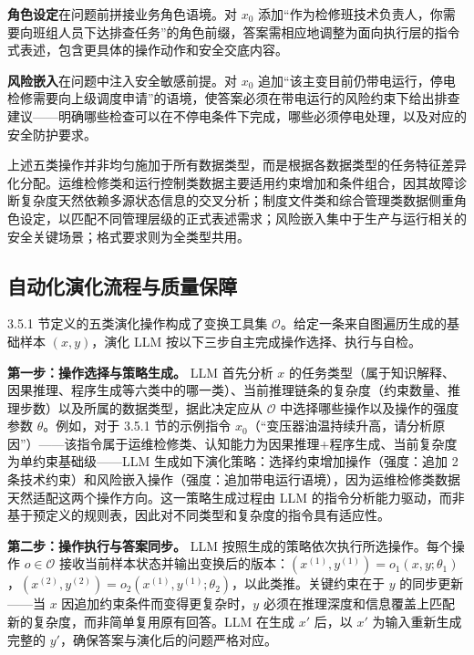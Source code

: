 \documentclass[fontset=fandol,type=master,campus=shenzhen,etitleauto=true]{hithesisbook}
\begin{document}
\textbf{角色设定}在问题前拼接业务角色语境。对 $x_0$ 添加``作为检修班技术负责人，你需要向班组人员下达排查任务''的角色前缀，答案需相应地调整为面向执行层的指令式表述，包含更具体的操作动作和安全交底内容。

\textbf{风险嵌入}在问题中注入安全敏感前提。对 $x_0$ 追加``该主变目前仍带电运行，停电检修需要向上级调度申请''的语境，使答案必须在带电运行的风险约束下给出排查建议------明确哪些检查可以在不停电条件下完成，哪些必须停电处理，以及对应的安全防护要求。

上述五类操作并非均匀施加于所有数据类型，而是根据各数据类型的任务特征差异化分配。运维检修类和运行控制类数据主要适用约束增加和条件组合，因其故障诊断复杂度天然依赖多源状态信息的交叉分析；制度文件类和综合管理类数据侧重角色设定，以匹配不同管理层级的正式表述需求；风险嵌入集中于生产与运行相关的安全关键场景；格式要求则为全类型共用。

\subsection{自动化演化流程与质量保障}\label{ux4ebaux673aux534fux540cux5ba1ux6838ux673aux5236}

3.5.1 节定义的五类演化操作构成了变换工具集 $\mathcal{O}$。给定一条来自图遍历生成的基础样本 $(x, y)$，演化 LLM 按以下三步自主完成操作选择、执行与自检。

\textbf{第一步：操作选择与策略生成。} LLM 首先分析 $x$ 的任务类型（属于知识解释、因果推理、程序生成等六类中的哪一类）、当前推理链条的复杂度（约束数量、推理步数）以及所属的数据类型，据此决定应从 $\mathcal{O}$ 中选择哪些操作以及操作的强度参数 $\theta$。例如，对于 3.5.1 节的示例指令 $x_0$（``变压器油温持续升高，请分析原因''）------该指令属于运维检修类、认知能力为因果推理+程序生成、当前复杂度为单约束基础级------LLM 生成如下演化策略：选择约束增加操作（强度：追加 2 条技术约束）和风险嵌入操作（强度：追加带电运行语境），因为运维检修类数据天然适配这两个操作方向。这一策略生成过程由 LLM 的指令分析能力驱动，而非基于预定义的规则表，因此对不同类型和复杂度的指令具有适应性。

\textbf{第二步：操作执行与答案同步。} LLM 按照生成的策略依次执行所选操作。每个操作 $o \in \mathcal{O}$ 接收当前样本状态并输出变换后的版本：$(x^{(1)}, y^{(1)}) = o_1(x, y; \theta_1)$，$(x^{(2)}, y^{(2)}) = o_2(x^{(1)}, y^{(1)}; \theta_2)$，以此类推。关键约束在于 $y$ 的同步更新------当 $x$ 因追加约束条件而变得更复杂时，$y$ 必须在推理深度和信息覆盖上匹配新的复杂度，而非简单复用原有回答。LLM 在生成 $x'$ 后，以 $x'$ 为输入重新生成完整的 $y'$，确保答案与演化后的问题严格对应。
\end{document}
